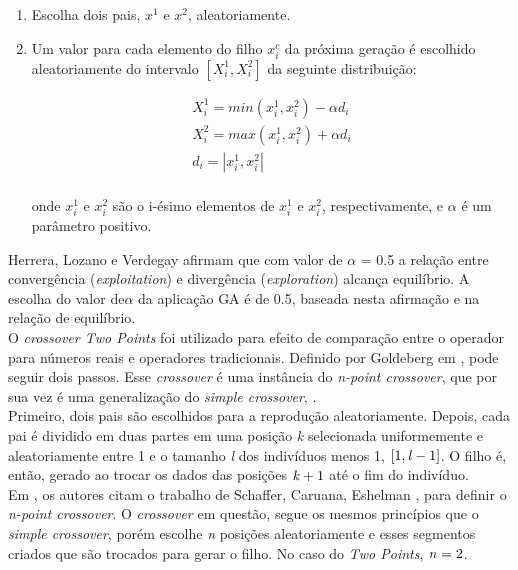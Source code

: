 \begin{enumerate}
  \item Escolha dois pais, $x^1$ e $x^2$, aleatoriamente.
  \item Um valor para cada elemento do filho $x^c_i$ da próxima geração é escolhido aleatoriamente do intervalo $[X^1_i, X^2_i]$ da seguinte distribuição:
\begin{center}
	\begin{equation}
	\begin{split}
		X^1_i = min(x^1_i,x^2_i) - \alpha d_i		\\
		X^2_i = max(x^1_i,x^2_i) + \alpha d_i 		\\
d_i = |x^1_i,x^2_i| \\
	\end{split}
	\end{equation}
\end{center}
onde $x^1_i$ e $x^2_i$ são o i-ésimo elementos de $x^1_i$ e $x^2_i$, respectivamente, e $\alpha$ é um parâmetro positivo.
\end{enumerate}

Herrera, Lozano e Verdegay \citep{herrera1998tackling} afirmam que com valor de $\alpha$ = 0.5 a relação entre convergência ({\it exploitation}) e divergência ({\it exploration}) alcança equilíbrio. A escolha do valor de$\alpha$ da aplicação GA é de 0.5, baseada nesta afirmação e na relação de equilíbrio.\\

O {\it crossover Two Points} foi utilizado para efeito de comparação entre o operador para números reais e operadores tradicionais. Definido por Goldeberg em \cite{Goldberg:1989:GAS:534133}, pode seguir dois passos. Esse {\it crossover} é uma instância do {\it n-point crossover}, que por sua vez é uma generalização do {\it simple crossover}, \cite{herrera1998tackling}.\\

Primeiro, dois pais são escolhidos para a reprodução aleatoriamente. Depois, cada pai é dividido em duas partes em uma posição {\it k} selecionada uniformemente e aleatoriamente entre 1 e o tamanho {\it l} dos indivíduos menos 1, $[1, {\it l} -1]$. O filho é, então, gerado ao trocar os dados das posições ${\it k} + 1$ até o fim do indivíduo.\\

Em \cite{herrera1998tackling}, os autores citam o trabalho de Schaffer, Caruana, Eshelman \cite{schaffer1989study}, para definir o {\it n-point crossover}. O {\it crossover} em questão, segue os mesmos princípios que o {\it simple crossover}, porém escolhe {\it n} posições aleatoriamente e esses segmentos criados que são trocados para gerar o filho. No caso do {\it Two Points}, ${\it n} = 2$.

